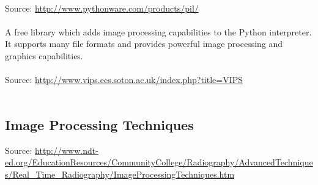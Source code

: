 \documentclass{article}
\begin{document}
 \\
Source: {\color{red} \url{http://www.pythonware.com/products/pil/}} \\ \\
A free library which adds image processing capabilities to the Python interpreter.  It supports many file formats and provides powerful image processing and graphics capabilities. \\

 \\
Source: {\color{red} \url{http://www.vips.ecs.soton.ac.uk/index.php?title=VIPS}} \\ \\


	\subsection*{Image Processing Techniques}
Source: {\color{red} \url{http://www.ndt-ed.org/EducationResources/CommunityCollege/Radiography/AdvancedTechniques/Real_Time_Radiography/ImageProcessingTechniques.htm}} \\ 
\end{document}
